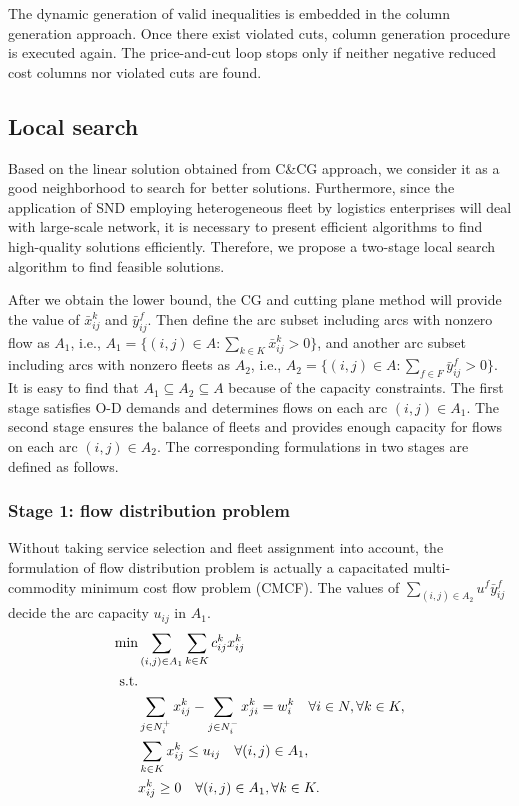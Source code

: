 \documentclass[11pt,nonblindrev,fleqn]{article}
\begin{document}
The dynamic generation of valid inequalities is embedded in the column generation approach. Once there exist violated cuts, column generation procedure is executed again. The price-and-cut loop stops only if neither negative reduced cost columns nor violated cuts are found.

\subsection{Local search}
Based on the linear solution obtained from C\&CG approach, we consider it as a good neighborhood to search for better solutions. Furthermore, since the application of SND employing heterogeneous fleet by logistics enterprises will deal with large-scale network, it is necessary to present efficient algorithms to find high-quality solutions efficiently. Therefore, we propose a two-stage local search algorithm to find feasible solutions.

After we obtain the lower bound, the CG and cutting plane method will provide the value of $\bar{x}_{ij}^k$ and $\bar{y}_{ij}^f$. Then define the arc subset including arcs with nonzero flow as $A_1$, i.e., $A_1 = \{ (i,j)\in A : \sum_{k\in K} \bar{x}_{ij}^k >0 \} $, and another arc subset including arcs with nonzero fleets as $A_2$, i.e., $A_2 =\{  (i,j)\in A : \sum_{f\in F} \bar{y}_{ij}^f >0 \}$. It is easy to find that $A_1\subseteq A_2 \subseteq A$ because of the capacity constraints. The first stage satisfies O-D demands and determines flows on each arc $(i,j)\in A_1$. The second stage ensures the balance of fleets and provides enough capacity for flows on each arc $(i,j)\in A_2$. The corresponding formulations in two stages are defined as follows.

\subsubsection{Stage 1: flow distribution problem}
Without taking service selection and fleet assignment into account, the formulation of flow distribution problem is actually a capacitated multi-commodity minimum cost flow problem (CMCF). The values of $\sum_{(i,j)\in A_2}u^f \bar{y}_{ij}^f $ decide the arc capacity $u_{ij}$ in $A_1$.
\begin{align}
   \min& \sum_{(i,j)\in A_1}\sum_{k\in K} c_{ij}^k x_{ij}^k     \\
   \rm{s.t.} & \nonumber \\
         &  \sum_{j\in N_i^+}x_{ij}^k - \sum_{j\in N_i^-}x_{ji}^k = w_i^k     \quad      \forall i\in N, \forall k\in K,  \\
         &  \sum_{k\in K} x_{ij}^k \leq u_{ij}      \quad    \forall (i,j)\in A_1,  \\
        &  x_{ij}^k \geq 0   \quad    \forall (i,j)\in A_1, \forall k\in K.
\end{align}
\end{document}
